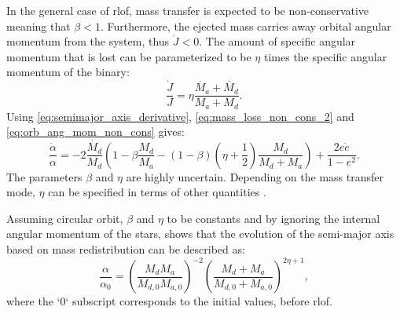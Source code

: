 In the general case of \ac{rlof}, mass transfer is expected to be non-conservative meaning that  $\beta < 1$. Furthermore,
the ejected mass carries away orbital angular momentum from the system, thus $\dot{J}<0$. The amount of specific angular momentum that is lost can be parameterized to be $\eta$ times the specific angular momentum of the binary:
\begin{equation}\label{eq:orb_ang_mom_non_cons}
    \frac{\dot{J}}{J} = \eta \frac{\dot{M_{a}} + \dot{M_{d}}}{M_{a} + M_{d}}.
\end{equation}
Using \cref{eq:semimajor_axis_derivative}, \cref{eq:mass_loss_non_cons_2} and \cref{eq:orb_ang_mom_non_cons} gives:
\begin{equation}\label{eq:orb_ang_momen_derivative_non_cons}
    \frac{\dot{\alpha}}{\alpha}= -2\frac{\dot{M_{d}}}{M_{d}} \left( 1- \beta\frac{M_d}{M_a} - (1-\beta)(\eta + \frac{1}{2}) \frac{M_d}{M_d + M_a}  \right)  + \frac{2e \dot{e}}{1-e^2}.
\end{equation}  
The parameters $\beta$ and $\eta$ are highly uncertain. Depending on the mass transfer mode, $\eta$ can be specified in terms of other quantities \citep{postnov2014evolution}.

Assuming circular orbit, $\beta$ and $\eta$ to be constants and by ignoring the internal angular momentum of the stars, \cite{portegies1995formation} shows that the evolution of the semi-major axis based on mass redistribution can be described as:
\begin{equation}\label{eq:semimajor_axis_no_cons}
    \frac{\alpha}{\alpha_{0}} = \left (\frac{M_{d} M_{a}}{M_{d,0} M_{a,0}} \right)^{-2} \left (\frac{M_{d} + M_{a}}{M_{d,0}+M_{a,0}} \right)^{2\eta +1},
\end{equation}    
where the `0` subscript corresponds to the initial values, before \ac{rlof}.
    




